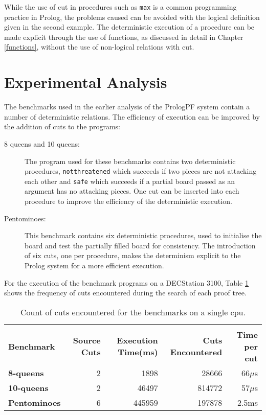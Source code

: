 While the use of cut in procedures such as \texttt{max} is a common programming practice
in Prolog, the problems caused can be avoided with the logical definition given in the second
example.  The deterministic execution of a procedure can be made explicit through the
use of functions, as discussed in detail in Chapter \ref{functions}, without the use
of non-logical relations with cut.

\section{Experimental Analysis} %
\label{cut_exp}

The benchmarks used in the earlier analysis of the PrologPF system contain a number
of deterministic relations.  The efficiency of execution can be improved by the
addition of cuts to the programs:
\begin{description}
\item[8 queens and 10 queens: ]{The program used for these benchmarks contains two
  deterministic procedures, \texttt{notthreatened} which succeeds if two pieces are
  not attacking each other and \texttt{safe} which succeeds if a partial board passed
  as an argument has no attacking pieces.  One cut can be inserted into each procedure
  to improve the efficiency of the deterministic execution.}
\item[Pentominoes: ]{This benchmark contains six deterministic procedures, used to
  initialise the board and test the partially filled board for consistency.  The
  introduction of six cuts, one per procedure, makes the determinism explicit to the
  Prolog system for a more efficient execution.}
\end{description}

For the execution of the benchmark programs on a DECStation 3100, Table \ref{cut_counts}
shows the frequency of cuts encountered during the search of each proof tree.

\begin{table}[htbp]
{\small
\begin{tabular}{| l | r | r | r | r |}
\hline
 & & & & \\[2mm]
\textbf{Benchmark} & \textbf{Source Cuts} & \textbf{Execution Time(ms)} & \textbf{Cuts Encountered} & \textbf{Time per cut} \\
\hline
\textbf{8-queens}    & 2 &   1898 &  28666 & 66$\mu$s \\
\hline
\textbf{10-queens}   & 2 &  46497 & 814772 & 57$\mu$s \\
\hline
\textbf{Pentominoes} & 6 & 445959 & 197878 & 2.5ms    \\
\hline
\end{tabular}
}
\caption{Count of cuts encountered for the benchmarks on a single cpu.}
\label{cut_counts}
\end{table}

